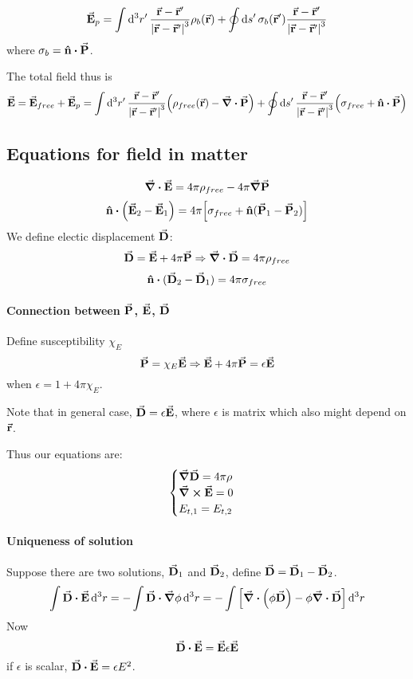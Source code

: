 $$\va{E}_p = \int \dd[3]{r'}  \frac{\va{r}-\va{r}'}{\abs{\va{r}-\va{r}'}^3} \rho_b(\va{r}) + \oint \dd{s'}  \sigma_b (\va{r}') \frac{\va{r}-\va{r}'}{\abs{\va{r}-\va{r}'}^3}  $$
where $\sigma_b = \vu{n} \vdot \va{P}$.

The total field thus is
$$\va{E} = \va{E}_{free} + \va{E}_p = \int \dd[3]{r'}  \frac{\va{r}-\va{r}'}{\abs{\va{r}-\va{r}'}^3} \qty(\rho_{free}(\va{r}) - \div{\va{P}}) + \oint \dd{s'}  \frac{\va{r}-\va{r}'}{\abs{\va{r}-\va{r}'}^3} \qty(\sigma_{free} + \vu{n} \vdot \va{P})$$

\subsection{Equations for field in matter}
$$\div{\va{E}} = 4\pi \rho_{free} - 4\pi \grad{\va{P}}$$
$$\vu{n}\vdot \qty(\va{E}_2-\va{E}_1) = 4\pi \qty[\sigma_{free} + \vu{n}(\va{P}_1-\va{P}_2) ]$$
We define electic displacement $\va{D}$:
$$\va{D} = \va{E} + 4\pi \va{P} \Rightarrow \div{\va{D}} = 4\pi \rho_{free}$$
$$\vu{n} \vdot (\va{D}_2 - \va{D}_1) = 4\pi \sigma_{free}$$

\paragraph{Connection between $\va{P}$, $\va{E}$, $\va{D}$}
Define susceptibility $\chi_E$
$$\va{P} = \chi_E\va{E} \Rightarrow \va{E} + 4\pi \va{P} = \epsilon \va{E}$$
when $\epsilon = 1+4\pi \chi_E$.

Note that in general case, $\va{D} = \epsilon \va{E}$, where $\epsilon$ is matrix which also might depend on $\va{r}$.

Thus our equations are:
$$\begin{cases}
\grad{\va{D}} = 4\pi \rho\\
\curl{\va{E}} = 0\\
E_{t,1}=E_{t,2}
\end{cases}$$

\paragraph{Uniqueness of solution}
Suppose there are two solutions, $\va{D}_1$ and $\va{D}_2$, define $\va{D} = \va{D}_1-\va{D}_2$.
$$\int \va{D}\vdot \va{E} \dd[3]{r} = -\int \va{D} \vdot \grad{\phi} \dd[3]{r} = - \int \qty[ \div(\phi\va{D}) - \phi \div{\va{D}}] \dd[3]{r}$$
Now
$$\va{D} \vdot \va{E} = \va{E} \epsilon \va{E}$$
if $\epsilon$ is scalar, $\va{D} \vdot \va{E} = \epsilon E^2$.

